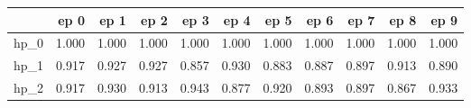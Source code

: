 \begin{tabular}{lrrrrrrrrrr}
\toprule
{} &   ep 0 &   ep 1 &   ep 2 &   ep 3 &   ep 4 &   ep 5 &   ep 6 &   ep 7 &   ep 8 &   ep 9 \\
\midrule
hp\_0 &  1.000 &  1.000 &  1.000 &  1.000 &  1.000 &  1.000 &  1.000 &  1.000 &  1.000 &  1.000 \\
hp\_1 &  0.917 &  0.927 &  0.927 &  0.857 &  0.930 &  0.883 &  0.887 &  0.897 &  0.913 &  0.890 \\
hp\_2 &  0.917 &  0.930 &  0.913 &  0.943 &  0.877 &  0.920 &  0.893 &  0.897 &  0.867 &  0.933 \\
\bottomrule
\end{tabular}
